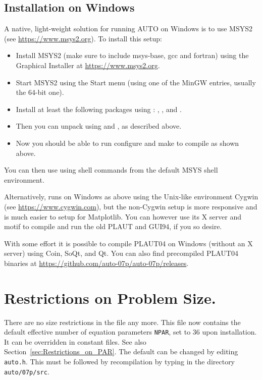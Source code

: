 \documentclass[12pt]{report}
\begin{document}
\subsection{Installation on Windows}
A native, light-weight solution for running AUTO on Windows is
to use MSYS2 (see \url{https://www.msys2.org}).
To install this setup:
\begin{itemize}
\item
Install MSYS2 (make sure to include msys-base, gcc and fortran)
using the Graphical Installer at \url{https://www.msys2.org}.
\item
Start MSYS2 using the Start menu (using one of the MinGW entries, usually
the 64-bit one).
\item
Install at least the following packages using :
, ,
and .
\item
Then you can unpack
\AUTO using  and , as described above.
\item
Now you should be able to run configure and make to compile \AUTO
as shown above.
\end{itemize}

You can then use \AUTO using shell commands from the default MSYS shell
environment.

Alternatively, \AUTO runs on Windows as above using the Unix-like
environment Cygwin (see \url{https://www.cygwin.com}), but the
non-Cygwin setup is more responsive and is much easier to setup for
Matplotlib. You can however use its X server and motif to compile
and run the old {\cal PLAUT} and GUI94, if you so desire.

With some effort it is possible to compile {\cal PLAUT04}
on Windows (without an X server) using Coin, SoQt, and Qt. You can
also find precompiled {\cal PLAUT04} binaries at
\url{https://github.com/auto-07p/auto-07p/releases}.

\section{ Restrictions on Problem Size.} \label{sec:Restrictions}
There are no size restrictions in the file  any more. This file now contains the
default effective number of equation parameters {\tt NPAR}, set to 36
upon installation. It can be overridden in constant files.
See also Section~\ref{sec:Restrictions_on_PAR}.
The default can be changed by editing {\tt auto.h}.
This must be followed by recompilation by typing  
in the directory {\tt auto/07p/src}.
\end{document}
